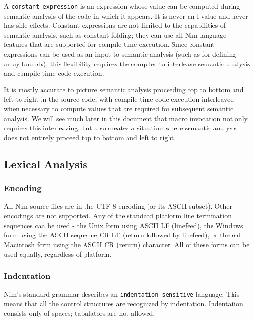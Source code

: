A \texttt{constant\ expression} is an expression whose value can be
computed during semantic analysis of the code in which it appears. It is
never an l-value and never has side effects. Constant expressions are
not limited to the capabilities of semantic analysis, such as constant
folding; they can use all Nim language features that are supported for
compile-time execution. Since constant expressions can be used as an
input to semantic analysis (such as for defining array bounds), this
flexibility requires the compiler to interleave semantic analysis and
compile-time code execution.

It is mostly accurate to picture semantic analysis proceeding top to
bottom and left to right in the source code, with compile-time code
execution interleaved when necessary to compute values that are required
for subsequent semantic analysis. We will see much later in this
document that macro invocation not only requires this interleaving, but
also creates a situation where semantic analysis does not entirely
proceed top to bottom and left to right.

\hypertarget{lexical-analysis}{%
\subsection{Lexical Analysis}\label{lexical-analysis}}

\hypertarget{encoding}{%
\subsubsection{Encoding}\label{encoding}}

All Nim source files are in the UTF-8 encoding (or its ASCII subset).
Other encodings are not supported. Any of the standard platform line
termination sequences can be used - the Unix form using ASCII LF
(linefeed), the Windows form using the ASCII sequence CR LF (return
followed by linefeed), or the old Macintosh form using the ASCII CR
(return) character. All of these forms can be used equally, regardless
of platform.

\hypertarget{indentation}{%
\subsubsection{Indentation}\label{indentation}}

Nim's standard grammar describes an \texttt{indentation\ sensitive}
language. This means that all the control structures are recognized by
indentation. Indentation consists only of spaces; tabulators are not
allowed.

